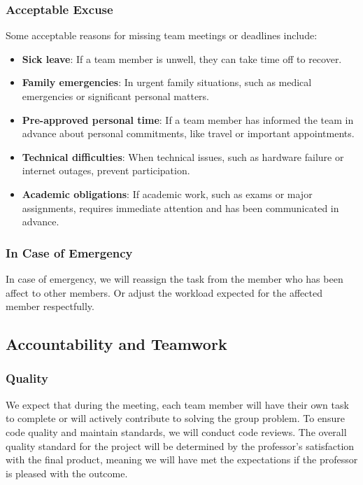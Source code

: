 \documentclass{article}
\begin{document}
\subsubsection*{Acceptable Excuse}
Some acceptable reasons for missing team meetings or deadlines include:
\begin{itemize}
    \item \textbf{Sick leave}: If a team member is unwell, they can take time off to recover.
    \item \textbf{Family emergencies}: In urgent family situations, such as medical emergencies or significant personal matters.
    \item \textbf{Pre-approved personal time}: If a team member has informed the team in advance about personal commitments, like travel or important appointments.
    \item \textbf{Technical difficulties}: When technical issues, such as hardware failure or internet outages, prevent participation.
    \item \textbf{Academic obligations}: If academic work, such as exams or major assignments, requires immediate attention and has been communicated in advance.
\end{itemize}

\subsubsection*{In Case of Emergency}

In case of emergency, we will reassign the task from the member who has been affect to other members. Or adjust the workload expected for the affected member respectfully.\\

\subsection*{Accountability and Teamwork}

\subsubsection*{Quality} 

We expect that during the meeting, each team member will have their own task to complete or will actively contribute to solving the group problem. To ensure code quality and maintain standards, we will conduct code reviews. The overall quality standard for the project will be determined by the professor's satisfaction with the final product, meaning we will have met the expectations if the professor is pleased with the outcome.
\end{document}
